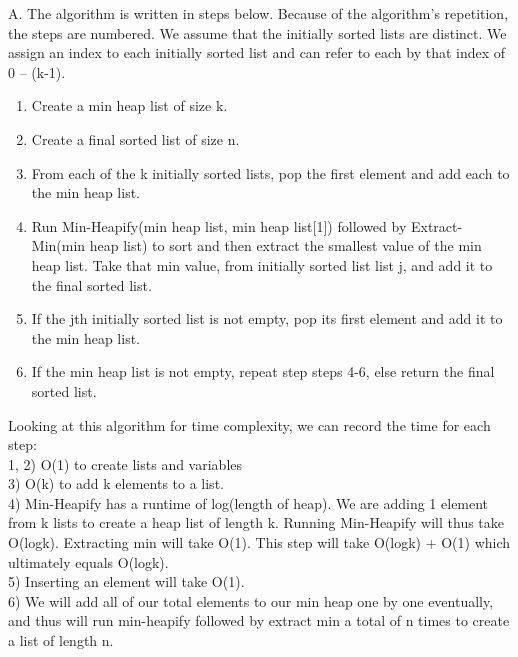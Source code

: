 \documentclass[11pt, solution, letterpaper]{format}
\begin{document}
A. The algorithm is written in steps below. Because of the algorithm's repetition, the steps are numbered. We assume that the initially sorted lists are distinct. We assign an index to each initially sorted list and can refer to each by that index of 0 -- (k-1). \\\begin{enumerate}
\item Create a min heap list of size k. \vspace{-3mm}
\item Create a final sorted list of size n.\vspace{-3mm}
\item From each of the k initially sorted lists, pop the first element and add each to the min heap list. \vspace{-3mm}
\item Run Min-Heapify(min heap list, min heap list[1]) followed by Extract-Min(min heap list) to sort and then extract the smallest value of the min heap list. Take that min value, from initially sorted list list j, and add it to the final sorted list. \vspace{-3mm}
\item If the jth initially sorted list is not empty, pop its first element and add it to the min heap list. \vspace{-3mm}
\item If the min heap list is not empty, repeat step steps 4-6, else return the final sorted list.\\\vspace{-3mm}
\end{enumerate} 
Looking at this algorithm for time complexity, we can record the time for each step:\\
1, 2) O(1) to create lists and variables\\
3) O(k) to add k elements to a list.\\
4) Min-Heapify has a runtime of log(length of heap). We are adding 1 element from k lists to create a heap list of length k. Running Min-Heapify will thus take O(logk). Extracting min will take O(1). This step will take O(logk) + O(1) which ultimately equals O(logk).\\
5) Inserting an element will take O(1). \\
6) We will add all of our total elements to our min heap one by one eventually, and thus will run min-heapify followed by extract min a total of n times to create a list of length n.\\
\end{document}

